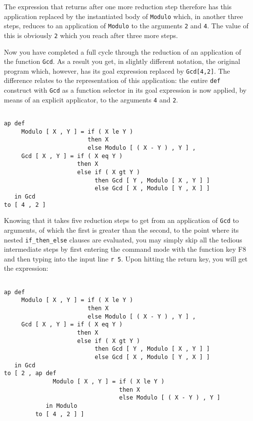 The expression that returns after one more reduction step therefore has this
application replaced by the instantiated body of {\tt Modulo} which, in
another three steps, reduces to an application of {\tt Modulo} to
the arguments {\tt 2} and {\tt 4}. The value of this is obviously {\tt 2}
which you reach after three more steps. 

Now you have completed a full cycle through the reduction
of an application of the function {\tt Gcd}.
As a result you get, in slightly different notation, the original
program which, however, has its goal expression 
replaced by {\tt Gcd[4,2]}. The difference relates to the representation of this application: the entire {\tt def} construct with {\tt Gcd} as 
a function
selector in its goal expression is now applied, by means of an explicit
applicator, to the arguments {\tt 4} and {\tt 2}.  
\begin{verbatim}

ap def 
     Modulo [ X , Y ] = if ( X le Y )
                        then X
                        else Modulo [ ( X - Y ) , Y ] ,
     Gcd [ X , Y ] = if ( X eq Y )
                     then X
                     else if ( X gt Y )
                          then Gcd [ Y , Modulo [ X , Y ] ]
                          else Gcd [ X , Modulo [ Y , X ] ]
   in Gcd
to [ 4 , 2 ]

\end{verbatim}
Knowing that it takes five reduction steps to get from an application of
{\tt Gcd} to arguments, of which the first is greater than the second, to
the point where its nested {\tt if\_then\_else} clauses are evaluated,
you may simply skip all the tedious intermediate steps by first entering the
command mode with the function key F8 and then typing into the input line
{\tt r 5}. Upon hitting the return key, you will get the expression: 
\begin{verbatim}

ap def 
     Modulo [ X , Y ] = if ( X le Y )
                        then X
                        else Modulo [ ( X - Y ) , Y ] ,
     Gcd [ X , Y ] = if ( X eq Y )
                     then X
                     else if ( X gt Y )
                          then Gcd [ Y , Modulo [ X , Y ] ]
                          else Gcd [ X , Modulo [ Y , X ] ]
   in Gcd
to [ 2 , ap def 
              Modulo [ X , Y ] = if ( X le Y )
                                 then X
                                 else Modulo [ ( X - Y ) , Y ]
            in Modulo
         to [ 4 , 2 ] ]

\end{verbatim}

